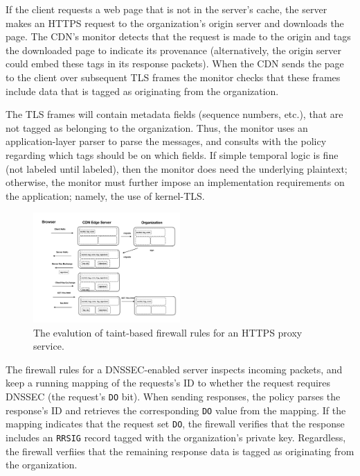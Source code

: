 If the client requests a web page that is not in the server's cache, the server
makes an HTTPS request to the organization's origin server and downloads the
page.
%
The CDN's monitor detects that the request is made to the origin and tags the
downloaded page to indicate its provenance (alternatively, the origin server
could embed these tags in its response packets).
%
When the CDN sends the page to the client over subsequent TLS frames the
monitor checks that these frames include data that is tagged as originating
from the organization. 


The TLS frames will contain metadata fields (sequence numbers, etc.),
that are not tagged as belonging to the organization.
%
Thus, the monitor uses an application-layer parser to parse the
messages, and consults with the policy regarding which tags should be on
which fields.
%
If simple temporal logic is fine (not labeled until labeled), then the monitor
does need the underlying plaintext; otherwise, the monitor must further impose
an implementation requirements on the application; namely, the use of
kernel-TLS\@.


\begin{figure}[t]
	\centering
    \includegraphics[width=0.5\textwidth]{figs/https-flowchart}
    \caption{The evalution of taint-based firewall rules for an HTTPS proxy
    service.}
	\label{fig:https-flowchart}
\end{figure}


%
The firewall rules for a DNSSEC-enabled server inspects incoming packets, and keep a
running mapping of the requests's ID to whether the request requires DNSSEC
(the request's \texttt{DO} bit).
%
When sending responses, the policy  parses the response's ID and retrieves the
corresponding \texttt{DO} value from the mapping.
%
If the mapping indicates that the request set \texttt{DO}, the firewall
verifies that the response includes an \texttt{RRSIG} record tagged with the
organization's private key.
%
Regardless, the firewall verfiies that the remaining response data is tagged as originating
from the organization.
